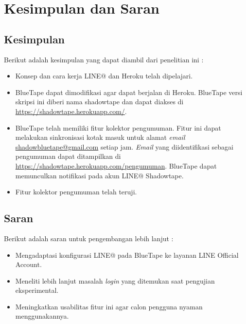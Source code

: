 \chapter{Kesimpulan dan Saran}
\section{Kesimpulan}
Berikut adalah kesimpulan yang dapat diambil dari penelitian ini :
\begin{itemize}
    \item Konsep dan cara kerja LINE@ dan Heroku telah dipelajari.
    \item BlueTape dapat dimodifikasi agar dapat berjalan di Heroku. BlueTape versi skripsi ini diberi nama shadowtape dan dapat diakses di \url{https://shadowtape.herokuapp.com/}.
    \item BlueTape telah memiliki fitur kolektor pengumuman. Fitur ini dapat melakukan sinkronisasi kotak masuk untuk alamat \textit{email} \href{mailto:shadowbluetape@gmail.com}{shadowbluetape@gmail.com} setiap jam. \textit{Email} yang diidentifikasi sebagai pengumuman dapat ditampilkan di \url{https://shadowtape.herokuapp.com/pengumuman}. BlueTape dapat memunculkan notifikasi pada akun LINE@ Shadowtape.
    \item Fitur kolektor pengumuman telah teruji.
\end{itemize}

\section{Saran}
Berikut adalah saran untuk pengembangan lebih lanjut :
\begin{itemize}
    \item Mengadaptasi konfigurasi LINE@ pada BlueTape ke layanan LINE Official Account.
    \item Meneliti lebih lanjut masalah \textit{login} yang ditemukan saat pengujian eksperimental.
    \item Meningkatkan usabilitas fitur ini agar calon pengguna nyaman menggunakannya.
\end{itemize}